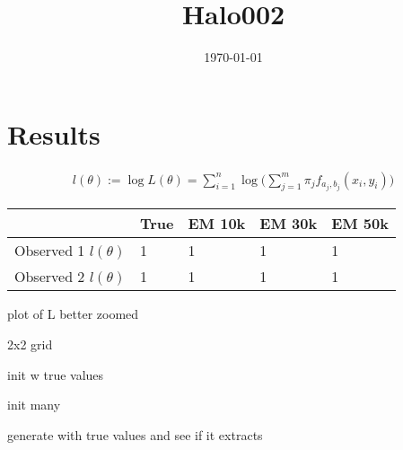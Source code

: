 \documentclass[12pt]{amsart}
\title{Halo002}
\author{\today}
\newcommand{\eqn}[1]{\begin{align*}
#1
\end{align*}}
\begin{document}
\maketitle



















\section{Results}


\eqn{
	l(\theta) := \log L(\theta) = \sum_{i=1}^{n} \log \Big( \sum_{j=1}^{m} \pi_j f_{a_j,b_j}(x_i,y_i) \Big)
}


\begin{table}[h]
	\begin{center}
		\begin{tabular}{l| l l l l}
			& 				True	& EM 10k	& 	EM 30k	&	EM 50k	\\
		 \hline
		 Observed 1 $l(\theta)$	&	1	& 1	&	 	1 & 			1	\\
		 Observed 2 $l(\theta)$	&	1	& 1	&	 	1 & 			1	\\
		\end{tabular}
	\end{center}
\end{table}





plot of L better zoomed

2x2 grid

init w true values

init many

generate with true values and see if it extracts
\end{document}
